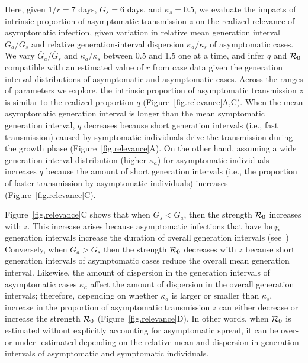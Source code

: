Here, given $1/r=7$ days, $\bar G_s=6$ days, and $\kappa_s=0.5$, we evaluate the impacts of intrinsic proportion of asymptomatic transmission $z$ on the realized relevance of asymptomatic infection, given variation in relative mean generation interval $\bar G_a/\bar G_s$ and relative generation-interval dispersion $\kappa_a/\kappa_s$ of asymptomatic cases.
We vary $\bar G_a/\bar G_s$ and $\kappa_a/\kappa_s$ between 0.5 and 1.5 one at a time, and infer $q$ and ${\cal{R}}_0$ compatible with an estimated value of $r$ from case data given the generation interval distributions of asymptomatic and asymptomatic cases.
Across the ranges of parameters we explore, the intrinsic proportion of asymptomatic transmission $z$ is similar to the realized proportion $q$ (Figure~\ref{fig.relevance}A,C).
When the mean asymptomatic generation interval is longer than the mean symptomatic generation interval, $q$ decreases because short generation intervals (i.e., fast transmission) caused by symptomatic individuals drive the transmission during the growth phase (Figure~\ref{fig.relevance}A).
On the other hand, assuming a wide generation-interval distribution (higher $\kappa_a$) for asymptomatic individuals increases $q$ because the amount of short generation intervals (i.e., the proportion of faster transmission by asymptomatic individuals) increases (Figure~\ref{fig.relevance}C).

Figure~\ref{fig.relevance}C shows that when $\bar G_s<\bar G_a$, then the strength ${\cal{R}}_0$ increases with $z$.
This increase arises because asymptomatic infections that have long generation intervals increase the duration of overall generation intervals (see~\citep{park_2019practical})
Conversely, when $\bar G_a > \bar G_s$ then the strength ${\cal{R}}_0$ decreases with $z$ because short generation intervals of asymptomatic cases reduce the overall mean generation interval.
Likewise, the amount of dispersion in the generation intervals of asymptomatic cases $\kappa_a$ affect the amount of dispersion in the overall generation intervals; 
therefore, depending on whether $\kappa_a$ is larger or smaller than $\kappa_s$, increase in the proportion of asymptomatic transmission $z$ can either decrease or increase the strength ${\cal{R}}_0$ (Figure~\ref{fig.relevance}D).
In other words, when ${\cal{R}}_0$ is estimated without explicitly accounting for asymptomatic spread, it can be over- or under- estimated depending on the relative mean and dispersion in generation intervals of asymptomatic and symptomatic individuals.

